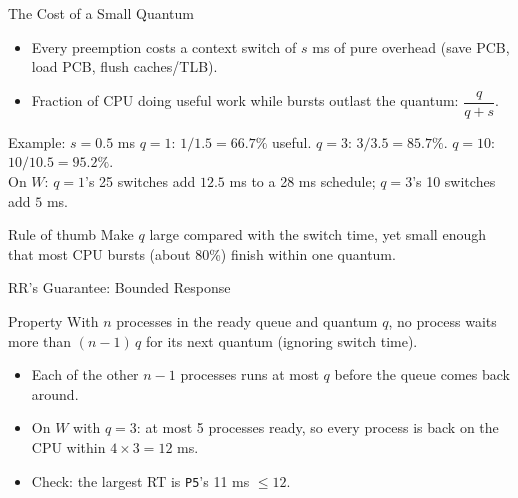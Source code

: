 \documentclass[aspectratio=169]{beamer}
\begin{document}
\begin{frame}{The Cost of a Small Quantum}
  \begin{itemize}
    \item Every preemption costs a context switch of $s$ ms of pure
      overhead (save PCB, load PCB, flush caches/TLB).
    \item Fraction of CPU doing useful work while bursts outlast the
      quantum: $\dfrac{q}{q+s}$.
  \end{itemize}
  \vspace{0.15cm}
  \begin{exampleblock}{Example: $s = 0.5$ ms}
    $q=1$: $1/1.5 = 66.7\%$ useful. \quad $q=3$: $3/3.5 = 85.7\%$. \quad
    $q=10$: $10/10.5 = 95.2\%$.\\[0.3em]
    On $W$: $q=1$'s 25 switches add $12.5$ ms to a 28 ms schedule;
    $q=3$'s 10 switches add $5$ ms.
  \end{exampleblock}
  \vspace{0.1cm}
  \begin{alertblock}{Rule of thumb}
    Make $q$ large compared with the switch time, yet small enough that
    most CPU bursts (about 80\%) finish within one quantum.
  \end{alertblock}
\end{frame}

\begin{frame}{RR's Guarantee: Bounded Response}
  \begin{block}{Property}
    With $n$ processes in the ready queue and quantum $q$, no process waits
    more than $(n-1)\,q$ for its next quantum (ignoring switch time).
  \end{block}
  \begin{itemize}
    \item Each of the other $n-1$ processes runs at most $q$ before the
      queue comes back around.
    \item On $W$ with $q=3$: at most 5 processes ready, so every process is
      back on the CPU within $4 \times 3 = 12$ ms.
    \item Check: the largest RT is \texttt{P5}'s 11 ms $\le 12$.
  \end{itemize}
  \vspace{0.15cm}
\end{frame}
\end{document}
